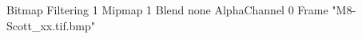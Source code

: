{Bitmap
	{Filtering 1}
	{Mipmap 1}
	{Blend none}
	{AlphaChannel 0}
	{Frame "M8-Scott_xx.tif.bmp"}
}
